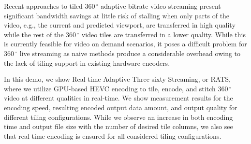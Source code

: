 Recent approaches to tiled $360\,^{\circ}$ adaptive bitrate video streaming present significant bandwidth savings at little risk of stalling when only parts of the video, e.g., the current and predicted viewport, are transferred in high quality while the rest of the $360\,^{\circ}$ video tiles are transferred in a lower quality. While this is currently feasible for video on demand scenarios, it poses a difficult problem for $360\,^{\circ}$ live streaming as naive methods produce a considerable overhead owing to the lack of tiling support in existing hardware encoders.

In this demo, we show Real-time Adaptive Three-sixty Streaming, or RATS, where we utilize GPU-based HEVC encoding to tile, encode, and stitch $360\,^{\circ}$ video at different qualities in real-time. We show measurement results for the encoding speed, resulting encoded output data amount, and output quality for different tiling configurations. While we observe an increase in both encoding time and output file size with the number of desired tile columns, we also see that real-time encoding is ensured for all considered tiling configurations.
